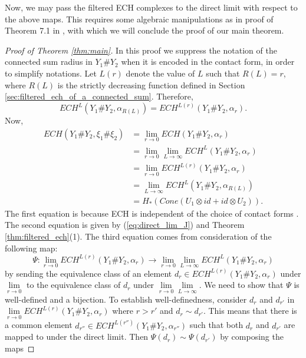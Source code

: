 \documentclass{article}
\numberwithin{equation}{section}
\theoremstyle{definition}
\begin{document}
Now, we may pass the filtered ECH complexes to the direct limit with respect to the above maps.  This requires some algebraic manipulations as in proof of Theorem 7.1 in \cite{Nelson_Morgan}, with which we will conclude the proof of our main theorem.


\begin{proof}[Proof of Theorem \ref{thm:main}]
In this proof we suppress the notation of the connected sum radius in $Y_1 \# Y_2$ when it is encoded in the contact form, in order to simplify notations. Let $L(r)$ denote the value of $L$ such that $R(L) = r$, where $R(L)$ is the strictly decreasing function defined in Section \ref{sec:filtered_ech_of_a_connected_sum}. Therefore, 
$$ECH^L(Y_1 \# Y_2, \alpha_{R(L)}) = ECH^{L(r)}(Y_1 \# Y_2, \alpha_r).$$ 
Now,
\begin{equation}
\label{eq:direct_limit_eq_chains}
\begin{split}
    ECH(Y_1\# Y_2, \xi_1 \# \xi_2) 
    &= \lim\limits_{r \to 0} ECH(Y_1 \# Y_2, \alpha_r) \\
    &= \lim\limits_{r \to 0}\lim\limits_{L \to \infty} ECH^L(Y_1 \# Y_2, \alpha_r) \\
    &= \lim\limits_{r \to 0}ECH^{L(r)}(Y_1 \# Y_2, \alpha_r) \\
    &= \lim\limits_{L \to \infty} ECH^L(Y_1 \# Y_2, \alpha_{R(L)}) \\
    &= H_*(Cone(U_1 \otimes id + id \otimes U_2)).
\end{split}
\end{equation}
The first equation is because ECH is independent of the choice of contact forms \cite{Taubes_isomorphism_I}. The second equation is given by (\ref{eq:direct_lim_J}) and Theorem \ref{thm:filtered_ech}(1). The third equation comes from consideration of the following map:
\begin{equation}
\label{eq:psi}
    \Psi: \lim\limits_{r \to 0}ECH^{L(r)}(Y_1 \# Y_2, \alpha_r) \longrightarrow \lim\limits_{r \to 0}\lim\limits_{L \to \infty} ECH^L(Y_1 \# Y_2, \alpha_r)
\end{equation}
by sending the equivalence class of an element $d_r\in ECH^{L(r)}(Y_1 \# Y_2, \alpha_r)$ under $\lim\limits_{r \to 0}$ to the equivalence class of $d_r$ under $\lim\limits_{r \to 0}\lim\limits_{L \to \infty}$.
We need to show that $\Psi$ is well-defined and a bijection. To establish well-definedness, consider $d_{r}$ and $d_{r'}$ in $\lim\limits_{r \to 0}ECH^{L(r)}(Y_1 \# Y_2, \alpha_r)$ where $r>r'$ and $d_{r}\sim d_{r'}$. This means that there is a common element $d_{r''}\in ECH^{L(r'')}(Y_1 \# Y_2, \alpha_{r''})$ such that both $d_{r}$ and $d_{r'}$ are mapped to under the direct limit. Then $\Psi(d_{r}) \sim \Psi(d_{r'})$ by composing the maps

\end{proof}
\end{document}
